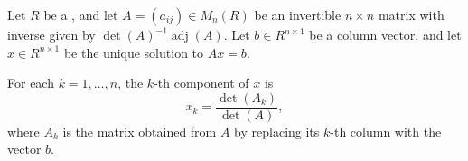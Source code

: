\begin{proposition} \label{proposition:cramers_rule_for_solving_linear_systems_over_a_commutative_ring}
    Let $R$ be a , and let $A = (a_{ij}) \in M_n(R)$ be an invertible $n \times n$ matrix with inverse given by $\det(A)^{-1}\operatorname{adj}(A)$. Let $b \in R^{n \times 1}$ be a column vector, and let $x \in R^{n \times 1}$ be the unique solution to $Ax = b$.

    For each $k = 1, \ldots, n$, the $k$-th component of $x$ is
    $$x_k = \frac{\det(A_k)}{\det(A)},$$
    where $A_k$ is the matrix obtained from $A$ by replacing its $k$-th column with the vector $b$.
\end{proposition}